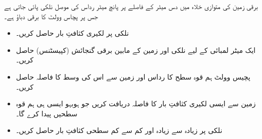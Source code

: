 برقی زمین کی متوازی خلاء میں دس میٹر کے فاصلے پر پانچ میٹر رداس کی موصل نلکی پائی جاتی ہے جس پر پچاس وولٹ کا برقی دباؤ ہے۔
\begin{itemize}
\item
نلکی پر لکیری کثافتِ بار حاصل کریں۔
\item
ایک میٹر لمبائی کے لیے نلکی اور زمین کے مابین برقی گنجائش (کپیسٹنس) حاصل کریں۔
\item
پچیس وولٹ ہم قوہ سطح کا رداس اور زمین سے اس کی وسط کا فاصلہ حاصل کریں۔ 
\item
زمین سے ایسی لکیری کثافتِ بار کا فاصلہ دریافت کریں جو ہوبہو ایسی ہی ہم قوہ سطحیں پیدا کرے گا۔
\item
نلکی پر زیادہ سے زیادہ  اور کم سے کم سطحی کثافتِ بار حاصل کریں۔

\end{itemize}

